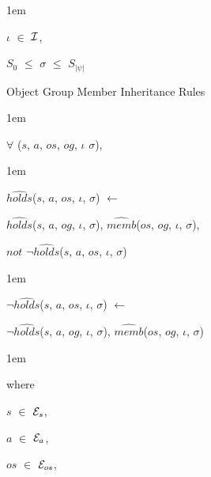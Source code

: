 \documentclass[11pt]{report}
\newenvironment{vquote}
{
  \begin{list}{}{\leftmargin 1em}\item[]
}
{
  \end{list}
}
\begin{document}
\begin{enumerate}
\begin{vquote}
                    \hspace{1em}
                    $\iota$ $\in$ ${\cal I}$,

                    \hspace{1em}
                    $S_{0}$ $\leq$ $\sigma$ $\leq$ $S_{|\psi|}$
                  \end{vquote}

                \item
                  Object Group Member Inheritance Rules

                  \begin{vquote}
                    $\forall$ ($s$, $a$, $os$, $og$, $\iota$ $\sigma$),
                  \end{vquote}

                  \begin{vquote}
                    $\hat{holds}$($s$, $a$, $os$, $\iota$, $\sigma$)
                    $\leftarrow$

                    \hspace{1em}
                    $\hat{holds}$($s$, $a$, $og$, $\iota$, $\sigma$),
                    $\hat{memb}$($os$, $og$, $\iota$, $\sigma$),

                    \hspace{1em}
                    $not$ $\lnot\hat{holds}$($s$, $a$, $os$, $\iota$, $\sigma$)
                  \end{vquote}

                  \begin{vquote}
                    $\lnot\hat{holds}$($s$, $a$, $os$, $\iota$, $\sigma$)
                    $\leftarrow$

                    \hspace{1em}
                    $\lnot\hat{holds}$($s$, $a$, $og$, $\iota$, $\sigma$),
                    $\hat{memb}$($os$, $og$, $\iota$, $\sigma$)
                  \end{vquote}

                  \begin{vquote}
                    where

                    \hspace{1em}
                    $s$ $\in$ ${\cal E}_{s}$,

                    \hspace{1em}
                    $a$ $\in$ ${\cal E}_{a}$,

                    \hspace{1em}
                    $os$ $\in$ ${\cal E}_{os}$,


\end{vquote}
\end{enumerate}
\end{document}
